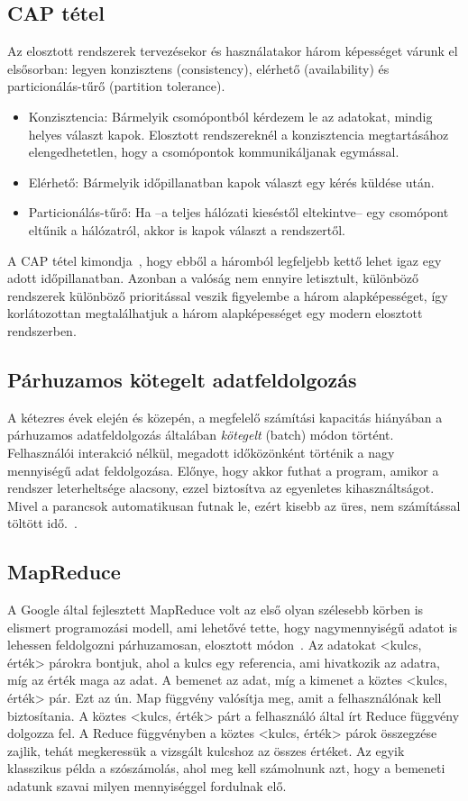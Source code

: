 \documentclass[a4paper,12pt]{article}
\begin{document}
\subsection{CAP tétel}
Az elosztott rendszerek tervezésekor és használatakor három képességet várunk el elsősorban: legyen konzisztens (consistency), elérhető (availability) és particionálás-tűrő (partition tolerance). 
\begin{itemize}
\item Konzisztencia: Bármelyik csomópontból kérdezem le az adatokat, mindig helyes választ kapok. Elosztott rendszereknél a konzisztencia megtartásához elengedhetetlen, hogy a csomópontok kommunikáljanak egymással. 
\item Elérhető: Bármelyik időpillanatban kapok választ egy kérés küldése után.
\item Particionálás-tűrő: Ha --a teljes hálózati kieséstől eltekintve-- egy csomópont eltűnik a hálózatról, akkor is kapok választ a rendszertől.
\end{itemize}
A CAP tétel kimondja~\parencite{cap}, hogy ebből a háromból legfeljebb kettő lehet igaz egy adott időpillanatban. Azonban a valóság nem ennyire letisztult, különböző rendszerek különböző prioritással veszik figyelembe a három alapképességet, így korlátozottan megtalálhatjuk a három alapképességet egy modern elosztott rendszerben.~\cite{ecap}

\subsection{Párhuzamos kötegelt adatfeldolgozás}
A kétezres évek elején és közepén, a megfelelő számítási kapacitás hiányában a párhuzamos adatfeldolgozás általában \textsl{kötegelt} (batch) módon történt. Felhasználói interakció nélkül, megadott időközönként történik a nagy mennyiségű adat feldolgozása. Előnye, hogy akkor futhat a program, amikor a rendszer leterheltsége alacsony, ezzel biztosítva az egyenletes kihasználtságot. Mivel a parancsok automatikusan futnak le, ezért kisebb az üres, nem számítással töltött idő.~\cite{batch}.

\subsection{MapReduce}
A Google által fejlesztett MapReduce volt az első olyan szélesebb körben is elismert programozási modell, ami lehetővé tette, hogy nagymennyiségű adatot is lehessen feldolgozni párhuzamosan, elosztott módon~\parencite{mapreduce}. Az adatokat <kulcs, érték> párokra bontjuk, ahol a kulcs egy referencia, ami hivatkozik az adatra, míg az érték maga az adat. A bemenet az adat, míg a kimenet a köztes <kulcs, érték> pár. Ezt az ún. Map függvény valósítja meg, amit a felhasználónak kell biztosítania. A köztes <kulcs, érték> párt a felhasználó által írt Reduce függvény dolgozza fel. A Reduce függvényben a köztes <kulcs, érték> párok összegzése  zajlik, tehát megkeressük a vizsgált kulcshoz az összes értéket. \newline
Az egyik klasszikus példa a szószámolás, ahol meg kell számolnunk azt, hogy a bemeneti adatunk szavai milyen mennyiséggel fordulnak elő.
\end{document}
